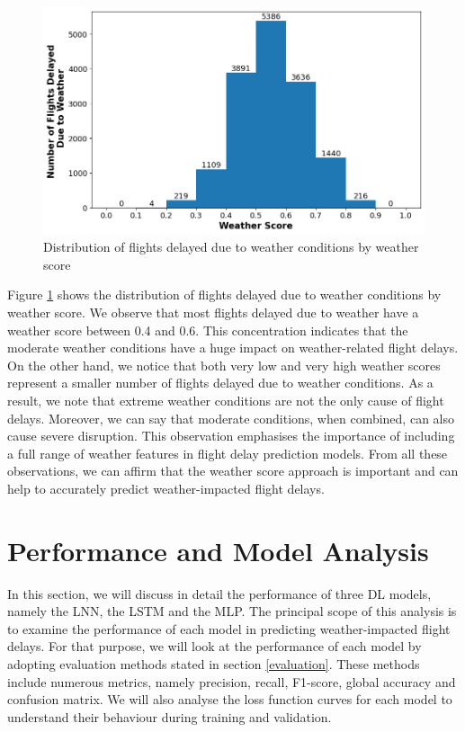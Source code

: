 \documentclass[12pt,oneside]{book} %
\begin{document}
\begin{figure}[H]
    \centering
    \includegraphics[width=0.9\linewidth]{Image/EDA_6.png}
    \caption{\centering Distribution of flights delayed due to weather conditions by weather score}
    \label{fig:EDA_6}
\end{figure}

\noindent Figure \ref{fig:EDA_6} shows the distribution of flights delayed due to weather conditions by weather score. We observe that most flights delayed due to weather have a weather score between 0.4 and 0.6. This concentration indicates that the moderate weather conditions have a huge impact on weather-related flight delays. On the other hand, we notice that both very low and very high weather scores represent a smaller number of flights delayed due to weather conditions. As a result, we note that extreme weather conditions are not the only cause of flight delays. Moreover, we can say that moderate conditions, when combined, can also cause severe disruption. This observation emphasises the importance of including a full range of weather features in flight delay prediction models. From all these observations, we can affirm that the weather score approach is important and can help to accurately predict weather-impacted flight delays.

\section{Performance and Model Analysis}

\noindent In this section, we will discuss in detail the performance of three DL models, namely the LNN, the LSTM and the MLP. The principal scope of this analysis is to examine the performance of each model in predicting weather-impacted flight delays. For that purpose, we will look at the performance of each model by adopting evaluation methods stated in section \ref{evaluation}. These methods include numerous metrics, namely precision, recall, F1-score, global accuracy and confusion matrix. We will also analyse the loss function curves for each model to understand their behaviour during training and validation.
\end{document}
